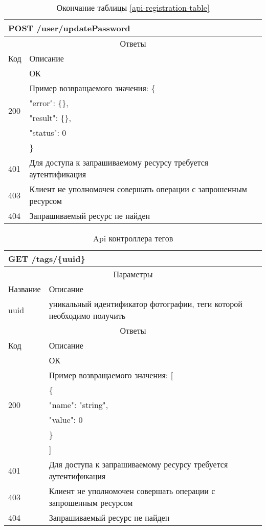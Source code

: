 \begin{table}[H]
  \caption*{Окончание таблицы \ref{api-registration-table}}
  \begin{tabular}{|p{6cm}|p{10cm}|}
  \hline \multicolumn{2}{|l|}{POST /user/updatePassword} \\
  \hline \multicolumn{2}{|c|}{Ответы} \\
  \hline Код & Описание \\
  \hline \multirow{6}{=}{200} & ОК \\
   & Пример возвращаемого значения: \{ \\
   & "error": \{\}, \\
   & "result": \{\}, \\
   & "status": 0 \\
   & \} \\
  \hline 401 & Для доступа к запрашиваемому ресурсу требуется аутентификация \\
  \hline 403 & Клиент не уполномочен совершать операции с запрошенным ресурсом \\
  \hline 404 & Запрашиваемый ресурс не найден \\
  \hline
  \end{tabular}
\end{table}

\begin{table}[H]
  \caption{Api контроллера тегов}\label{use-case-15-table}
  \begin{tabular}{|p{6cm}|p{10cm}|}
  \hline \multicolumn{2}{|l|}{GET /tags/\{uuid\}} \\
  \hline \multicolumn{2}{|c|}{Параметры} \\
  \hline Название & Описание \\
  \hline uuid & уникальный идентификатор фотографии, теги которой необходимо получить \\
  \hline \multicolumn{2}{|c|}{Ответы} \\
  \hline Код & Описание \\
  \hline \multirow{7}{=}{200} & ОК \\
   & Пример возвращаемого значения: [ \\
   & \{ \\
   & "name": "string", \\
   & "value": 0 \\
   & \} \\
   & ] \\
  \hline 401 & Для доступа к запрашиваемому ресурсу требуется аутентификация \\
  \hline 403 & Клиент не уполномочен совершать операции с запрошенным ресурсом \\
  \hline 404 & Запрашиваемый ресурс не найден \\
  \hline
  \end{tabular}
\end{table}

